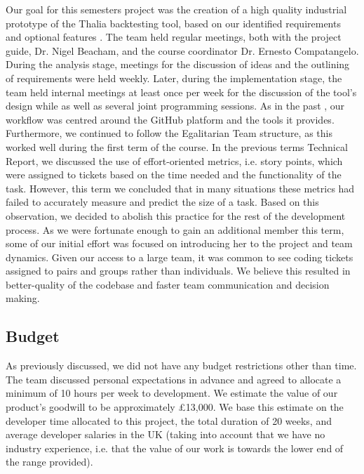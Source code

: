 \documentclass[main.tex]{subfiles}
\begin{document}
Our goal for this semesters project was the creation of a high quality industrial prototype of the Thalia backtesting tool, based on our identified requirements and optional features \cite{TR}. The team held regular meetings, both with the project guide, Dr. Nigel Beacham, and the course coordinator Dr. Ernesto Compatangelo. During the analysis stage, meetings for the discussion of ideas and the outlining of requirements were held weekly. Later, during the implementation stage, the team held internal meetings at least once per week for the discussion of the tool's design while as well as several joint programming sessions. \newline \newline
As in the past \cite{TR}, our workflow was centred around the GitHub platform and the tools it provides.
Furthermore, we continued to follow the Egalitarian Team structure, as this worked well during the first term of the course.
In the previous terms Technical Report, we discussed the use of effort-oriented metrics, i.e. story points, which were assigned to tickets based on the time needed and the functionality of the task.
However, this term we concluded that in many situations these metrics had failed to accurately measure and predict the size of a task. Based on this observation, we decided to abolish this practice for the rest of the development process. \newline \newline
As we were fortunate enough to gain an additional member this term, some of our initial effort was focused on introducing her to the project and team dynamics. Given our access to a large team, it was common to see coding tickets assigned to pairs and groups rather than individuals. We believe this resulted in better-quality of the codebase and faster team communication and decision making.

\subsection{Budget}
As previously discussed, we did not have any budget restrictions other than time. The team discussed personal expectations in advance and agreed to allocate a minimum of 10 hours per week to development. We estimate the value of our product's goodwill to be approximately £13,000. We base this estimate on the developer time allocated to this project, the total duration of 20 weeks, and average developer salaries in the UK \cite{DeveloperSalary} (taking into account that we have no industry experience, i.e. that the value of our work is towards the lower end of the range provided).
\end{document}

